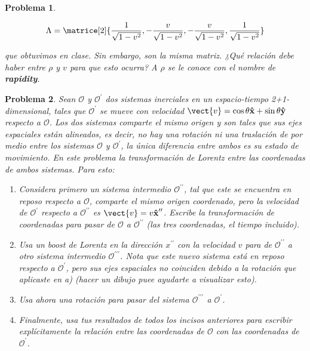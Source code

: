 \documentclass[12pt]{article}
\theoremstyle{break}
\newtheorem{exercise}{Problema}
\theoremstyle{nonumberbreak}
\DeclareRobustCommand{\uvec}[1]{{%
  \ifcsname uvec#1\endcsname
     \csname uvec#1\endcsname
   \else
    \bm{\hat{\mathbf{#1}}}%
   \fi
}}%
\newcommand*{\observer}{\mathcal{O}}
\newcommand*{\primeobserver}{\mathcal{O}^{\prime}}
\newcommand*{\biprimeobserver}{\mathcal{O}^{\prime\prime}}
\newcommand*{\triprimeobserver}{\mathcal{O}^{\prime\prime\prime}}
\begin{document}
\begin{exercise}
\begin{enumerate}[label = \alph*)]
            \begin{equation*}
                \Lambda =
                        \matrice[2]{\frac{1}{\sqrt{1 - v^{2}}},
                                    -\frac{v}{\sqrt{1 - v^{2}}},
                                    -\frac{v}{\sqrt{1 - v^{2}}},
                                    \frac{1}{\sqrt{1 - v^{2}}}}
            \end{equation*}

            que obtuvimos en clase. Sin embargo, son la misma matriz. ¿Qué relación debe haber entre \(\rho\) y \(v\) para que esto ocurra? A \(\rho\) se le conoce con el nombre de \textbf{rapidity}.
        \end{enumerate}
    \end{exercise}

    \begin{exercise}
        Sean \(\observer\) y \(\primeobserver\) dos sistemas inerciales en un espacio-tiempo 2+1-dimensional, tales que \(\primeobserver\) se mueve con velocidad \(\vect{v} = \cos\theta\uvec{x} + \sin\theta\uvec{y}\) respecto a \(\observer\). Los dos sistemas comparte el mismo origen y son tales que sus ejes espaciales están alineados, es decir, no hay una rotación ni una traslación de por medio entre los sistemas \(\observer\) y \(\primeobserver\), la única diferencia entre ambos es su estado de movimiento. En este problema la transformación de Lorentz entre las coordenadas de ambos sistemas. Para esto:

        \begin{enumerate}
            \item Considera primero un sistema intermedio \(\biprimeobserver\), tal que este se encuentra en reposo respecto a \(\observer\), comparte el mismo origen coordenado, pero la velocidad de \(\primeobserver\) respecto a \(\biprimeobserver\) es \(\vect{v} = v\uvec{x}^{\prime\prime}\). Escribe la transformación de coordenadas para pasar de \(\observer\) a \(\biprimeobserver\) (las tres coordenadas, el tiempo incluido).
            \item Usa un boost de Lorentz en la dirección \(x^{\prime\prime}\) con la velocidad \(v\) para de \(\biprimeobserver\) a otro sistema intermedio \(\triprimeobserver\). Nota que este nuevo sistema está en reposo respecto a \(\primeobserver\), pero sus ejes espaciales no coinciden debido a la rotación que aplicaste en a) (hacer un dibujo puee ayudarte a visualizar esto).
            \item Usa ahora una rotación para pasar del sistema \(\triprimeobserver\) a \(\primeobserver\).
            \item Finalmente, usa tus resultados de todos los incisos anteriores para escribir explícitamente la relación entre las coordenadas de \(\observer\) con las coordenadas de \(\primeobserver\).
        \end{enumerate}
    \end{exercise}
\end{document}
